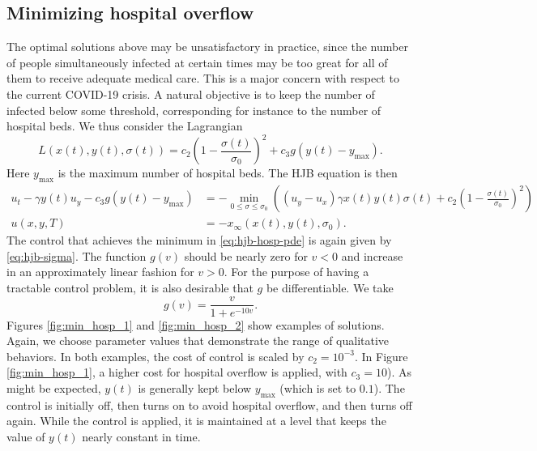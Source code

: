 \documentclass[english,12pt,letter]{article}
\newcommand{\Rnot}{\sigma_0}
\newcommand{\Sinf}{x_\infty}
\newcommand{\ymax}{y_\text{max}}
\begin{document}
\subsection{Minimizing hospital overflow}
The optimal solutions above may be unsatisfactory in practice,
since the number of people simultaneously infected at certain times
may be too great for all of them to receive adequate medical care.  This is a major concern
with respect to the current COVID-19 crisis.  A natural objective is to keep
the number of infected below some threshold, corresponding for instance to the
number of hospital beds.  We thus consider the Lagrangian
$$
    L(x(t),y(t),\sigma(t)) = c_2 \left(1-\frac{\sigma(t)}{\Rnot}\right)^2 + c_3 g(y(t)-y_\text{max}).
$$
Here $\ymax$ is the maximum number of hospital beds.
The HJB equation is then
\begin{subequations} \label{eq:hjb-hosp}
\begin{align} \label{eq:hjb-hosp-pde}
    u_t - \gamma y(t) u_y - c_3 g(y(t)-y_\text{max}) & = - \min_{0\le \sigma\le \Rnot} \left((u_y-u_x)\gamma x(t) y(t) \sigma(t) + c_2 \left(1-\frac{\sigma(t)}{\Rnot}\right)^2 \right) \\
    u(x,y,T) & = -\Sinf(x(t),y(t),\Rnot).
\end{align}
\end{subequations}
The control that achieves the minimum in \eqref{eq:hjb-hosp-pde} is again given by \eqref{eq:hjb-sigma}.
The function $g(v)$ should be nearly zero for $v<0$ and increase
in an approximately linear fashion for $v>0$.  For the purpose of having
a tractable control problem, it is also desirable that $g$ be differentiable.
We take
$$
g(v) = \frac{v}{1+e^{-10v}}.
$$
Figures \ref{fig:min_hosp_1} and \ref{fig:min_hosp_2} show examples of solutions.
Again, we choose parameter values that demonstrate the range of qualitative behaviors.
In both examples, the cost of control is scaled by $c_2=10^{-3}$.
In Figure \ref{fig:min_hosp_1}, a higher cost for hospital overflow is applied,
with $c_3=10$).  As might be expected, $y(t)$ is generally
kept below $\ymax$ (which is set to $0.1$).
The control is initially off, then turns on
to avoid hospital overflow, and then turns off again.  While the control is applied,
it is maintained at a level that keeps the value of $y(t)$ nearly constant in time.
\end{document}
